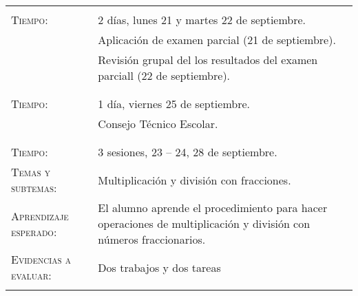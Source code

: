 \documentclass[letterpaper,10pt]{article}
\begin{document}
\begin{tabular}[t]{R{0.25\textwidth}p{0.71\textwidth}}
\\ \hline \\
 
    \textsc{Tiempo:}& 2 d\'ias, lunes 21 y martes 22  de septiembre. \\
                    & {\Large \sc Aplicaci\'on de examen parcial} (21 de septiembre). \\ 
                    & Revisi\'on grupal del los resultados del examen parciall (22 de septiembre).\\
\\ \hline \\
 
    \textsc{Tiempo:}& 1 d\'ia, viernes 25 de septiembre. \\
                    & {\Large \sc Consejo T\'ecnico Escolar.} \\ 
\\ \hline \\

    \textsc{Tiempo:}                    & 3 sesiones, 23 -- 24, 28 de septiembre. \\
    \textsc{Temas y subtemas:}          & Multiplicaci\'on y divisi\'on con fracciones. \\
    \textsc{Aprendizaje esperado: }     & El alumno aprende el procedimiento
    para hacer operaciones de multiplicaci\'on y divisi\'on con n\'umeros
    fraccionarios. \\
    \textsc{Evidencias a evaluar:}      & Dos trabajos y dos tareas \\\\

\end{tabular}
\end{document}
